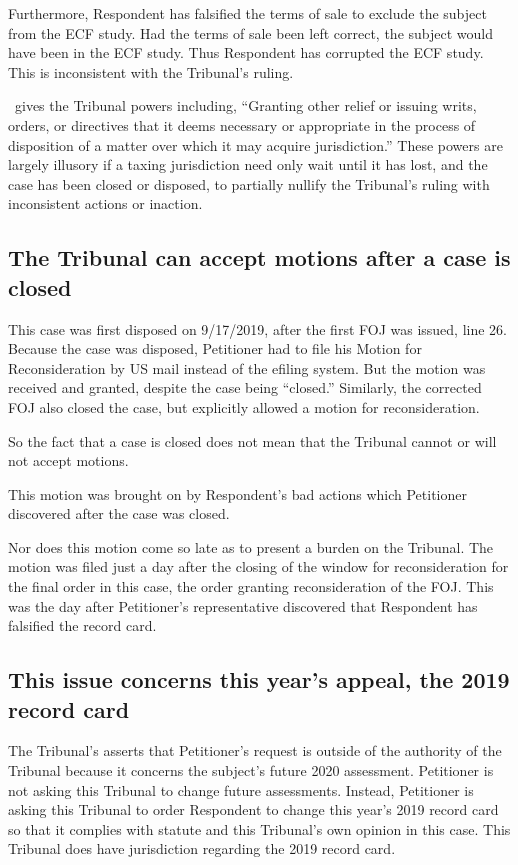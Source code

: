 \documentclass[12pt,\documentclassflag]{michiganCourtOfAppealsBrief}
\begin{document}
Furthermore, Respondent has falsified the terms of sale to exclude the subject from the ECF study. Had the terms of sale been left correct, the subject would have been in the ECF study. Thus Respondent has corrupted the ECF study. This is inconsistent with the Tribunal's ruling. 

\cite[s]{MCL 205.732(c)}\ gives the Tribunal powers including, ``Granting other relief or issuing writs, orders, or directives that it deems necessary or appropriate in the process of disposition of a matter over which it may acquire jurisdiction.'' These powers are largely illusory if a taxing jurisdiction need only wait until it has lost, and the case has been closed or disposed, to partially nullify the Tribunal's ruling with inconsistent actions or inaction.

\subsection{The Tribunal can accept motions after a case is closed}

This case was first disposed on 9/17/2019, after the first FOJ was issued, line 26. Because the case was disposed, Petitioner had to file his Motion for Reconsideration by US mail instead of the efiling system. But the motion was received and granted, despite the case being ``closed.'' 
Similarly, the corrected FOJ also closed the case, but explicitly allowed a motion for reconsideration.

So the fact that a case is closed does not mean that the Tribunal cannot or will not accept motions.

This motion was brought on by Respondent's bad actions which Petitioner discovered after the case was closed.

Nor does this motion come so late as to present a burden on the Tribunal. The motion was filed just a day after the closing of the window for reconsideration for the final order in this case, the order granting reconsideration of the FOJ. This was the day after Petitioner's representative discovered that Respondent has falsified the record card. 

\subsection{This issue concerns this year's appeal, the 2019 record card}

The Tribunal's asserts that Petitioner's request is outside of the authority of the Tribunal because it concerns the subject's future 2020 assessment. Petitioner is not asking this Tribunal to change future assessments. Instead, Petitioner is asking this Tribunal to order Respondent to change this year's 2019 record card so that it complies with statute and this Tribunal's own opinion in this case. This Tribunal does have jurisdiction regarding the 2019 record card.
\end{document}
